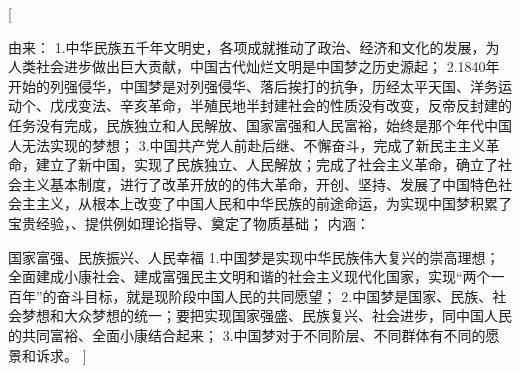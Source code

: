\begin{enumerate}
	\question[试述中国梦的由来和内涵。]
	\ans[{
               由来：{
                  1.中华民族五千年文明史，各项成就推动了政治、经济和文化的发展，为人类社会进步做出巨大贡献，中国古代灿烂文明是中国梦之历史源起；
                  2.1840年开始的列强侵华，中国梦是对列强侵华、落后挨打的抗争，历经太平天国、洋务运动个、戊戌变法、辛亥革命，半殖民地半封建社会的性质没有改变，反帝反封建的任务没有完成，民族独立和人民解放、国家富强和人民富裕，始终是那个年代中国人无法实现的梦想；
                  3.中国共产党人前赴后继、不懈奋斗，完成了新民主主义革命，建立了新中国，实现了民族独立、人民解放；完成了社会主义革命，确立了社会主义基本制度，进行了改革开放的的伟大革命，开创、坚持、发展了中国特色社会主主义，从根本上改变了中国人民和中华民族的前途命运，为实现中国梦积累了宝贵经验，、提供例如理论指导、奠定了物质基础；
                             }
               内涵：{
                   国家富强、民族振兴、人民幸福 {
                   1.中国梦是实现中华民族伟大复兴的崇高理想；全面建成小康社会、建成富强民主文明和谐的社会主义现代化国家，实现“两个一百年”的奋斗目标，就是现阶段中国人民的共同愿望；
                   2.中国梦是国家、民族、社会梦想和大众梦想的统一；要把实现国家强盛、民族复兴、社会进步，同中国人民的共同富裕、全面小康结合起来；
                   3.中国梦对于不同阶层、不同群体有不同的愿景和诉求。
                              } ]
	
	\question[资本—帝国主义的入侵给中国带来了什么？]
	
}}
\end{enumerate}
